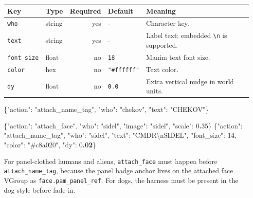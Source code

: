 \documentclass[
  11pt,
]{book}
\newenvironment{Shaded}{}{}
\newcommand{\CharTok}[1]{\textcolor[rgb]{0.25,0.44,0.63}{#1}}
\newcommand{\DataTypeTok}[1]{\textcolor[rgb]{0.56,0.13,0.00}{#1}}
\newcommand{\DecValTok}[1]{\textcolor[rgb]{0.25,0.63,0.44}{#1}}
\newcommand{\ErrorTok}[1]{\textcolor[rgb]{1.00,0.00,0.00}{\textbf{#1}}}
\newcommand{\FunctionTok}[1]{\textcolor[rgb]{0.02,0.16,0.49}{#1}}
\newcommand{\StringTok}[1]{\textcolor[rgb]{0.25,0.44,0.63}{#1}}
\begin{document}
\begin{longtable}[]{@{}llrll@{}}
\toprule\noalign{}
Key & Type & Required & Default & Meaning \\
\midrule\noalign{}
\endhead
\bottomrule\noalign{}
\endlastfoot
\texttt{who} & string & yes & - & Character key. \\
\texttt{text} & string & yes & - & Label text; embedded
\texttt{\textbackslash{}n} is supported. \\
\texttt{font\_size} & float & no & \texttt{18} & Manim text font
size. \\
\texttt{color} & hex & no & \texttt{"\#ffffff"} & Text color. \\
\texttt{dy} & float & no & \texttt{0.0} & Extra vertical nudge in world
units. \\
\end{longtable}

\begin{Shaded}
\begin{Highlighting}[]
\FunctionTok{\{}\DataTypeTok{"action"}\FunctionTok{:} \StringTok{"attach\_name\_tag"}\FunctionTok{,} \DataTypeTok{"who"}\FunctionTok{:} \StringTok{"chekov"}\FunctionTok{,} \DataTypeTok{"text"}\FunctionTok{:} \StringTok{"CHEKOV"}\FunctionTok{\}}
\end{Highlighting}
\end{Shaded}

\begin{Shaded}
\begin{Highlighting}[]
\FunctionTok{\{}\DataTypeTok{"action"}\FunctionTok{:} \StringTok{"attach\_face"}\FunctionTok{,} \DataTypeTok{"who"}\FunctionTok{:} \StringTok{"sidel"}\FunctionTok{,} \DataTypeTok{"image"}\FunctionTok{:} \StringTok{"sidel"}\FunctionTok{,} \DataTypeTok{"scale"}\FunctionTok{:} \DecValTok{0}\ErrorTok{.}\DecValTok{35}\FunctionTok{\}}
\FunctionTok{\{}\DataTypeTok{"action"}\FunctionTok{:} \StringTok{"attach\_name\_tag"}\FunctionTok{,} \DataTypeTok{"who"}\FunctionTok{:} \StringTok{"sidel"}\FunctionTok{,}
 \DataTypeTok{"text"}\FunctionTok{:} \StringTok{"CMDR}\CharTok{\textbackslash{}n}\StringTok{SIDEL"}\FunctionTok{,} \DataTypeTok{"font\_size"}\FunctionTok{:} \DecValTok{14}\FunctionTok{,} \DataTypeTok{"color"}\FunctionTok{:} \StringTok{"\#c8a020"}\FunctionTok{,} \DataTypeTok{"dy"}\FunctionTok{:} \DecValTok{0}\ErrorTok{.02}\FunctionTok{\}}
\end{Highlighting}
\end{Shaded}

For panel-clothed humans and aliens, \texttt{attach\_face} must happen
before \texttt{attach\_name\_tag}, because the panel badge anchor lives
on the attached face VGroup as \texttt{face.pam\_panel\_ref}. For dogs,
the harness must be present in the dog style before fade-in.
\end{document}
